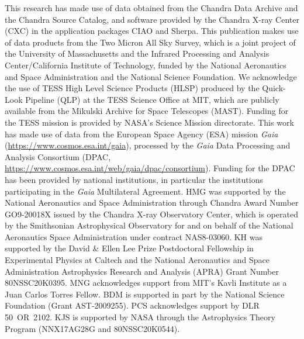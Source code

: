 \documentclass[linenumbers]{aastex631}
\begin{document}
\begin{acknowledgements}
This research has made use of data obtained from the Chandra Data Archive and the Chandra Source Catalog, and software provided by the Chandra X-ray Center (CXC) in the application packages CIAO and Sherpa. This publication makes use of data products from the Two Micron All Sky Survey, which is a joint project of the University of Massachusetts and the Infrared Processing and Analysis Center/California Institute of Technology, funded by the National Aeronautics and Space Administration and the National Science Foundation. We acknowledge the use of TESS High Level Science Products (HLSP) produced by the Quick-Look Pipeline (QLP) at the TESS Science Office at MIT, which are publicly available from the Mikulski Archive for Space Telescopes (MAST). Funding for the TESS mission is provided by NASA's Science Mission directorate.
This work has made use of data from the European Space Agency (ESA) mission {\it Gaia} (\url{https://www.cosmos.esa.int/gaia}), processed by the {\it Gaia} Data Processing and Analysis Consortium (DPAC, \url{https://www.cosmos.esa.int/web/gaia/dpac/consortium}). Funding for the DPAC has been provided by national institutions, in particular the institutions participating in the {\it Gaia} Multilateral Agreement.
HMG was supported by the National Aeronautics and Space Administration through Chandra Award Number GO9-20018X issued by the Chandra X-ray Observatory Center, which is operated by the Smithsonian Astrophysical Observatory for and on behalf of the National Aeronautics Space Administration under contract NAS8-03060.
KH was supported by the David {\&} Ellen Lee Prize Postdoctoral Fellowship in Experimental Physics at Caltech and the National Aeronautics and Space Administration Astrophysics Research and Analysis (APRA) Grant Number 80NSSC20K0395.
MNG acknowledges support from MIT's Kavli Institute as a Juan Carlos Torres Fellow.  BDM is supported in part by the National Science Foundation (Grant AST-2009255). PCS acknowledges support by DLR 50~OR~2102.  KJS is supported by NASA through the Astrophysics Theory Program (NNX17AG28G and 80NSSC20K0544).
\end{acknowledgements}



{}



\end{document}
